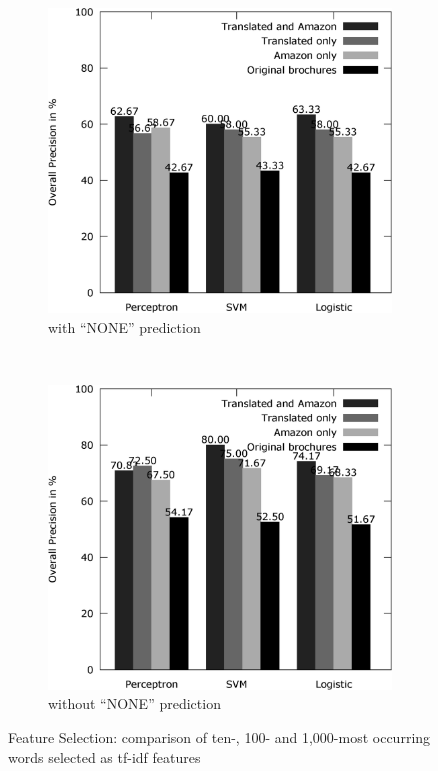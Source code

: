 \begin{figure}[h!]
	\centering
	\begin{subfigure}[t]{0.5\textwidth}
		\includegraphics[width=\textwidth]{figures/product_translate_amazon_with_none.eps}
		\caption{with ``NONE'' prediction}
	\end{subfigure}~
	\begin{subfigure}[t]{0.5\textwidth}
		\includegraphics[width=\textwidth]{figures/product_translate_amazon_without_none.eps}
		\caption{without ``NONE'' prediction}
	\end{subfigure}
	\caption{Feature Selection: comparison of ten-, 100- and 1,000-most occurring words selected as tf-idf features}
	\label{fig:product_translate_amazon}
\end{figure}

